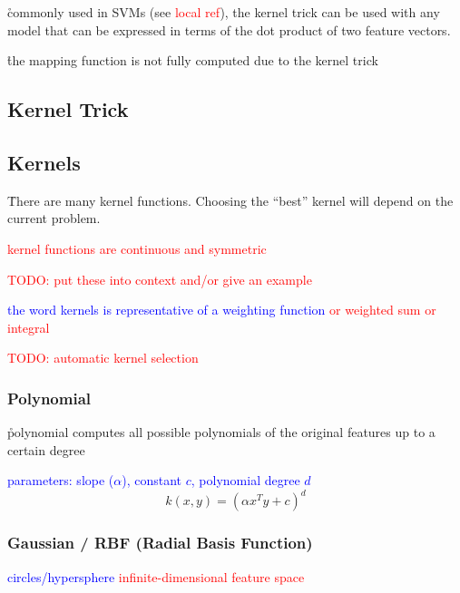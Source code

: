 \r{commonly used in SVMs (see \textcolor{red}{local ref}), the kernel trick can be used with any model that can be expressed in terms of the dot product of two feature vectors.}

\r{the mapping function is not fully computed due to the kernel trick}

\subsection{Kernel Trick}

\subsection{Kernels}

\r{There are many kernel functions. Choosing the ``best'' kernel will depend on the current problem.}

\textcolor{red}{kernel functions are continuous and symmetric}

\textcolor{red}{TODO: put these into context and/or give an example}

\textcolor{blue}{the word kernels is representative of a weighting function \textcolor{red}{or weighted sum or integral}}



\textcolor{red}{TODO: automatic kernel selection}

\subsubsection{Polynomial}

\r{polynomial computes all possible polynomials of the original features up to a certain degree}

\textcolor{blue}{parameters: slope ($\alpha$), constant $c$, polynomial degree $d$}
\begin{equation}
{k(x, y) = (\alpha x^T y + c)^d}
\label{eq:kernel_polynomial_eq}
\end{equation}

\subsubsection{Gaussian / RBF (Radial Basis Function)}

\textcolor{blue}{circles/hypersphere}
\textcolor{red}{infinite-dimensional feature space}

